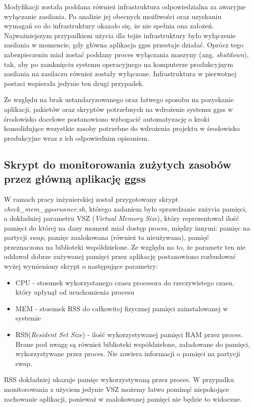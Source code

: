 Modyfikacji została poddana również infrastruktura odpowiedzialna za awaryjne wyłączanie zasilania. Po analizie jej obecnych możliwości oraz uzyskaniu wymagań co do infrastruktury okazało się, że nie spełnia ona założeń. Najważniejszym przypadkiem użycia dla tejże infrastruktury było wyłączenie zasilania w momencie, gdy główna aplikacja ggss przestaje działać. Oprócz tego zabezpieczeniu miał zostać poddany proces wyłączania maszyny (ang. \emph{shutdown}), tak, aby po zamknięciu systemu operacyjnego na komputerze produkcyjnym zasilania na zasilaczu również zostały wyłączone. Infrastruktura w pierwotnej postaci wspierała jedynie ten drugi przypadek.

Ze względu na brak ustandaryzowanego oraz łatwego sposobu na pozyskanie aplikacji, pakietów oraz skryptów potrzebnych na wdrożenie systemu ggss w środowisko docelowe postanowiono wzbogacić automatyzację o kroki konsolidujące wszystkie zasoby potrzebne do wdrożenia projektu w środowisko produkcyjne wraz z ich odpowiednim opisaniem.

\subsection{Skrypt do monitorowania zużytych zasobów przez główną aplikację ggss}

W ramach pracy inżynierskiej został przygotowany skrypt \emph{check\_mem\_ggssrunner.sh}, którego zadaniem było sprawdzanie zużycia pamięci, a dokładniej parametru VSZ (\emph{Virtual Memory Size}), który reprezentował ilość pamięci do której na dany moment miał dostęp proces, między innymi: pamięc na partycji \emph{swap}, pamięc zaalokowana (również ta nieużywana), pamięć przeznaczona na biblioteki współdzielone. Ze względu na to, że parametr ten nie oddawał dobrze zużywanej pamięci przez aplikację postanowiono rozbudować wyżej wymieniony skrypt o następujące parametry:
\begin{itemize}
    \item CPU - stosunek wykorzystanego czasu procesora do rzeczywistego czasu, który upłynął od uruchomienia procesu
    \item MEM - stosunek RSS do całkowitej fizycznej pamięci zainstalowanej w systemie
    \item RSS(\emph{Resident Set Size}) - ilość wykorzystywanej pamięci RAM przez proces. Brane pod uwagę są również biblioteki współdzielone, załadowane do pamięci, wykorzystywane przez proces. Nie zawiera informacji o pamięci na partycji swap.
\end{itemize}
RSS dokładniej ukazuje pamięc wykorzystywaną przez proces. W przypadku monitorowania z użyciem jedynie VSZ możemy łatwo pominąć niepokojące zachowanie aplikacji, ponieważ w zaalokowanej pamięci nie będzie to widoczne.


